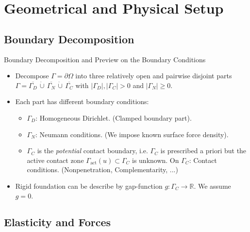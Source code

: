 \documentclass[10pt,aspectratio=169]{beamer}
\def\R{{\mathbb R}}
\begin{document}
\section{Geometrical and Physical Setup}

\subsection{Boundary Decomposition}

\begin{frame}{Boundary Decomposition and Preview on the Boundary Conditions}
	\begin{itemize}
		\item Decompose $\Gamma = \partial\Omega$ into three relatively open and pairwise disjoint parts $\Gamma = \overline{\Gamma_D}\,\mathbin{\dot\cup}\,\overline{\Gamma_N}\,\mathbin{\dot\cup}\,\overline{\Gamma_C}$ with $|\Gamma_D|,|\Gamma_C|>0$ and $|\Gamma_N|\ge 0$.
		\item Each part has different boundary conditions:
		      \begin{itemize}
			      \item $\Gamma_D$: Homogeneous Dirichlet. (Clamped boundary part).
			      \item $\Gamma_N$: Neumann conditions. (We impose known surface force density).
			      \item $\Gamma_C$ is the {\em potential} contact boundary, i.e. $\Gamma_C$ is prescribed a priori but the active contact zone $\Gamma_{\mathrm{act}}(u)\subset\Gamma_C$ is unknown. On $\Gamma_C$: Contact conditions. (Nonpenetration, Complementarity, ...)
		      \end{itemize}
		\item Rigid foundation can be describe by gap-function $g:\Gamma_C\to\R$. We assume $g = 0$.
	\end{itemize}
	\begin{figure}[!h]
		\centering
		
	\end{figure}
\end{frame}

\subsection{Elasticity and Forces}
\end{document}
